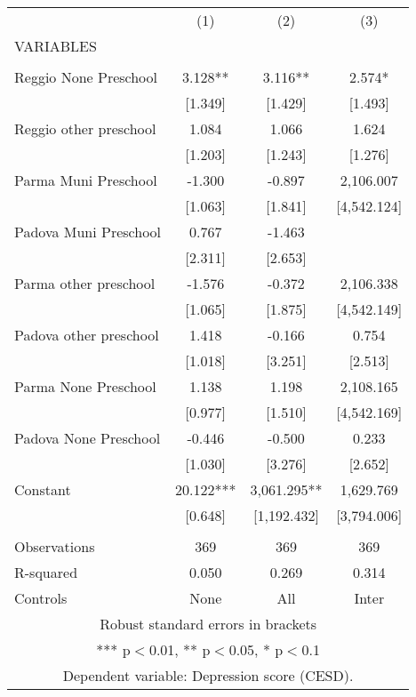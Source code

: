 \begin{tabular}{lccc} \hline
 & (1) & (2) & (3) \\
VARIABLES &  &  &  \\ \hline
 &  &  &  \\
Reggio None Preschool & 3.128** & 3.116** & 2.574* \\
 & [1.349] & [1.429] & [1.493] \\
Reggio other preschool & 1.084 & 1.066 & 1.624 \\
 & [1.203] & [1.243] & [1.276] \\
Parma Muni Preschool & -1.300 & -0.897 & 2,106.007 \\
 & [1.063] & [1.841] & [4,542.124] \\
Padova Muni Preschool & 0.767 & -1.463 &  \\
 & [2.311] & [2.653] &  \\
Parma other preschool & -1.576 & -0.372 & 2,106.338 \\
 & [1.065] & [1.875] & [4,542.149] \\
Padova other preschool & 1.418 & -0.166 & 0.754 \\
 & [1.018] & [3.251] & [2.513] \\
Parma None Preschool & 1.138 & 1.198 & 2,108.165 \\
 & [0.977] & [1.510] & [4,542.169] \\
Padova None Preschool & -0.446 & -0.500 & 0.233 \\
 & [1.030] & [3.276] & [2.652] \\
Constant & 20.122*** & 3,061.295** & 1,629.769 \\
 & [0.648] & [1,192.432] & [3,794.006] \\
 &  &  &  \\
Observations & 369 & 369 & 369 \\
R-squared & 0.050 & 0.269 & 0.314 \\
 Controls & None & All & Inter \\ \hline
\multicolumn{4}{c}{ Robust standard errors in brackets} \\
\multicolumn{4}{c}{ *** p$<$0.01, ** p$<$0.05, * p$<$0.1} \\
\multicolumn{4}{c}{ Dependent variable: Depression score (CESD).} \\
\end{tabular}
